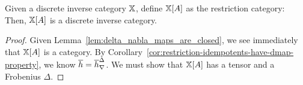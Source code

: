 \begin{proposition}\label{prop:slice-a-is-a-discrete-inverse-category}
  Given a discrete inverse category $\mathbb{X}$, define $\mathbb{X}[A]$ as  the restriction category:
  Then, $\mathbb{X}[A]$ is a discrete inverse category.
\end{proposition}
\begin{proof}
  Given Lemma~\ref{lem:delta_nabla_maps_are_closed}, we see immediately that $\mathbb{X}[A]$ is a
  category. By Corollary~\ref{cor:restriction-idempotents-have-dmap-property}, we know $\overline{h} = {\overline{h}}^{\Delta}_{\nabla}$.
  We must show  that $\mathbb{X}[A]$ has a tensor and a Frobenius $\Delta$.



\end{proof}
